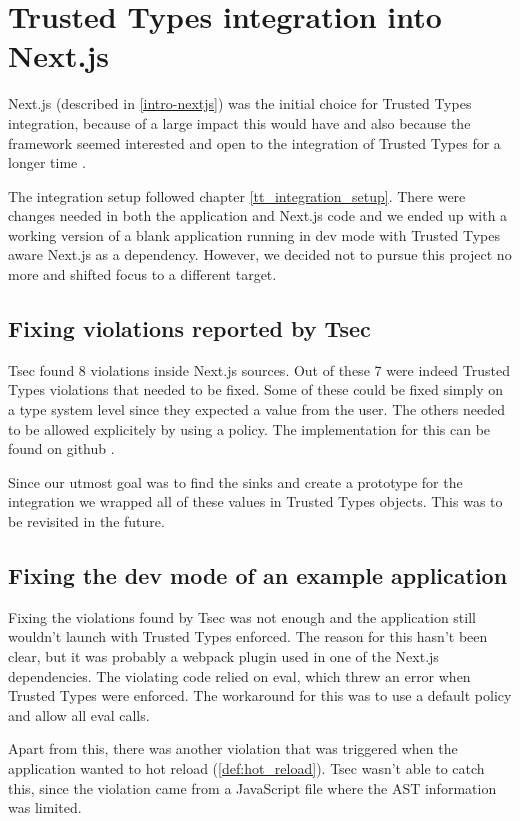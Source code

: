 \chapter{Trusted Types integration into Next.js}

Next.js (described in \ref{intro-nextjs}) was the initial choice for Trusted Types integration,
because of a large impact this would have and also because the framework seemed interested and open
to the integration of Trusted Types for a longer time \cite{nextjs_tt_pr_2020}.

The integration setup followed chapter \ref{tt_integration_setup}. There were changes needed in both
the application and Next.js code and we ended up with a working version of a blank application
running in dev mode with Trusted Types aware Next.js as a dependency. However, we decided not to
pursue this project no more and shifted focus to a different target.

\section{Fixing violations reported by Tsec}

Tsec found 8 violations \cite{tsec_output} inside Next.js sources. Out of these 7 were indeed
Trusted Types violations that needed to be fixed. Some of these could be fixed simply on a type
system level since they expected a value from the user. The others needed to be allowed explicitely
by using a policy. The implementation for this can be found on github
\cite{nextjs_fix_tsec_violations_commit}.

Since our utmost goal was to find the sinks and create a prototype for the integration we wrapped
all of these values in Trusted Types objects. This was to be revisited in the future.

\section{Fixing the dev mode of an example application}


Fixing the violations found by Tsec was not enough and the application still wouldn't launch with
Trusted Types enforced. The reason for this hasn't been clear, but it was probably a webpack plugin
used in one of the Next.js dependencies. The violating code relied on eval, which threw an error
when Trusted Types were enforced. The workaround for this was to use a default policy and allow all
eval calls.

Apart from this, there was another violation that was triggered when the application wanted to hot
reload (\ref{def:hot_reload}). Tsec wasn't able to catch this, since the violation came from a
JavaScript file where the AST information was limited.
